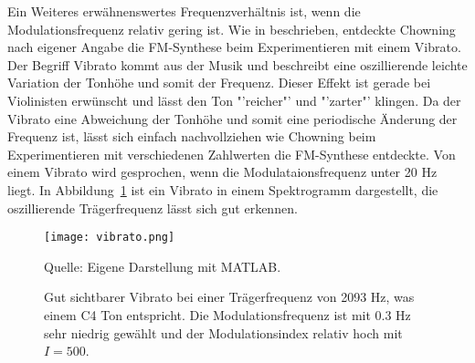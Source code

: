 Ein Weiteres erwähnenswertes Frequenzverhältnis ist, wenn die Modulationsfrequenz relativ gering ist.
Wie in  beschrieben, entdeckte Chowning nach eigener Angabe die FM-Synthese beim Experimentieren mit einem Vibrato. Der Begriff Vibrato kommt aus der Musik und beschreibt eine oszillierende leichte Variation der Tonhöhe und somit der Frequenz. Dieser Effekt ist gerade bei Violinisten erwünscht und lässt den Ton "'reicher"' und "'zarter"' klingen. \cite[S. 422]{tobias} Da der Vibrato eine Abweichung der Tonhöhe und somit eine periodische Änderung der Frequenz ist, lässt sich einfach nachvollziehen wie Chowning beim Experimentieren mit verschiedenen Zahlwerten die FM-Synthese entdeckte. Von einem Vibrato wird gesprochen, wenn die Modulataionsfrequenz unter 20 Hz liegt. In Abbildung~\ref{fig:vibrato} ist ein Vibrato in einem Spektrogramm dargestellt, die oszillierende Trägerfrequenz lässt sich gut erkennen.

\begin{figure} [ht]
\centering
  \texttt{[image: vibrato.png]}
\caption{Gut sichtbarer Vibrato bei einer Trägerfrequenz von 2093 Hz, was einem C4 Ton entspricht. Die Modulationsfrequenz ist mit 0.3 Hz sehr niedrig gewählt und der Modulationsindex relativ hoch mit $I=500$.}
\label{fig:vibrato}
Quelle: Eigene Darstellung mit MATLAB.
\end{figure}











\FloatBarrier 
